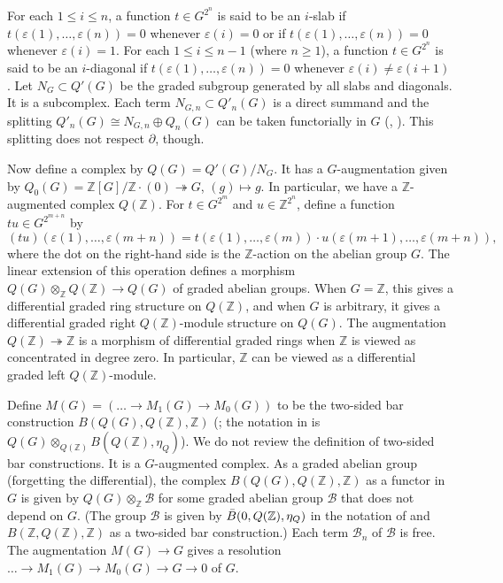 \documentclass{amsart}
\theoremstyle{remark}
\numberwithin{equation}{subsection}
\newcommand{\onto}{\twoheadrightarrow}
\newcommand{\tensor}{\mathbin{\otimes}}
\newcommand{\Z}{\mathbb{Z}}
\begin{document}
For each $1 \le i \le n$, a function $t \in G^{2^{n}}$ is said to be an $i$-slab
if $t(\varepsilon(1), \dots, \varepsilon(n)) = 0$ whenever $\varepsilon(i) = 0$
or if $t(\varepsilon(1), \dots, \varepsilon(n)) = 0$ whenever $\varepsilon(i) = 1$.
For each $1 \le i \le n - 1$ (where $n \ge 1$),
a function $t \in G^{2^{n}}$ is said to be an $i$-diagonal
if $t(\varepsilon(1), \dots, \varepsilon(n)) = 0$
whenever $\varepsilon(i) \ne \varepsilon(i + 1)$.
Let $N_{G} \subset Q'(G)$ be the graded subgroup generated by all slabs and diagonals.
It is a subcomplex.
Each term $N_{G, n} \subset Q'_{n}(G)$ is a direct summand
and the splitting $Q'_{n}(G) \cong N_{G, n} \oplus Q_{n}(G)$ can be taken functorially in $G$
(\cite[Section 5]{Pir96}, \cite[Proposition 2.6]{JP91}).
This splitting does not respect $\partial$, though.

Now define a complex by $Q(G) = Q'(G) / N_{G}$.
It has a $G$-augmentation given by $Q_{0}(G) = \Z[G] / {\Z \cdot (0)} \onto G$, $(g) \mapsto g$.
In particular, we have a $\Z$-augmented complex $Q(\Z)$.
For $t \in G^{2^{m}}$ and $u \in \Z^{2^{n}}$,
define a function $t u \in G^{2^{m + n}}$ by
	\[
			(t u)(\varepsilon(1), \dots, \varepsilon(m + n))
		=
				t(\varepsilon(1), \dots, \varepsilon(m))
			\cdot
				u(\varepsilon(m + 1), \dots, \varepsilon(m + n)),
	\]
where the dot on the right-hand side is the $\Z$-action on the abelian group $G$.
The linear extension of this operation defines a morphism
$Q(G) \tensor_{\Z} Q(\Z) \to Q(G)$ of graded abelian groups.
When $G = \Z$, this gives a differential graded ring structure on $Q(\Z)$,
and when $G$ is arbitrary,
it gives a differential graded right $Q(\Z)$-module structure on $Q(G)$.
The augmentation $Q(\Z) \onto \Z$ is a morphism of differential graded rings
when $\Z$ is viewed as concentrated in degree zero.
In particular, $\Z$ can be viewed as a differential graded left $Q(\Z)$-module.

Define $M(G) = (\dots \to M_{1}(G) \to M_{0}(G))$ to be the two-sided bar construction $B(Q(G), Q(\Z), \Z)$
(\cite[Appendix A]{GM74};
the notation in \cite[Section 7]{ML57} is
$Q(G) \tensor_{Q(\Z)} B(Q(\Z), \eta_{Q})$).
We do not review the definition of two-sided bar constructions.
It is a $G$-augmented complex.
As a graded abelian group (forgetting the differential),
the complex $B(Q(G), Q(\Z), \Z)$ as a functor in $G$ is given by
$Q(G) \tensor_{\Z} \mathcal{B}$
for some graded abelian group $\mathcal{B}$ that does not depend on $G$.
(The group $\mathcal{B}$ is given by $\Bar{B}(0, Q(\Z), \eta_{Q})$
in the notation of \cite[(7-5)]{ML57}
and $B(\Z, Q(\Z), \Z)$ as a two-sided bar construction.)
Each term $\mathcal{B}_{n}$ of $\mathcal{B}$ is free.
The augmentation $M(G) \to G$ gives a resolution
$\dots \to M_{1}(G) \to M_{0}(G) \to G \to 0$ of $G$.
\end{document}
